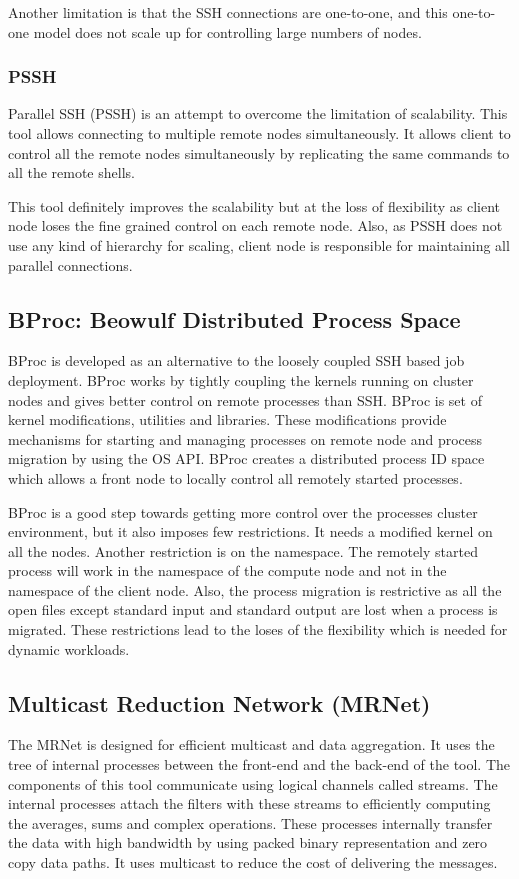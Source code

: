 Another limitation is that the SSH connections are one-to-one, and this
one-to-one model does not scale up for controlling large numbers of nodes.

\subsubsection{PSSH}
Parallel SSH (PSSH)\cite{pssh} is an attempt to overcome the limitation of
scalability.  This tool allows connecting to multiple remote nodes
simultaneously.  It allows client to control all the remote nodes simultaneously
by replicating the same commands to all the remote shells.

This tool definitely improves the scalability but at the loss of flexibility as
client node loses the fine grained control on each remote node.  Also, as PSSH
does not use any kind of hierarchy for scaling, client node is responsible for
maintaining all parallel connections.

\subsection{BProc: Beowulf Distributed Process Space}
BProc\cite{bproc} is developed as an alternative to the loosely coupled SSH
based job deployment. BProc works by tightly coupling the kernels running on
cluster nodes and gives better control on remote processes than SSH.  BProc
is set of kernel modifications, utilities and libraries.  These modifications
provide mechanisms for starting and managing processes on remote node and
process migration by using the OS API.  BProc creates a distributed process ID
space which allows a front node to locally control all remotely started
processes.

BProc is a good step towards getting more control over the processes cluster
environment, but it also imposes few restrictions.  It needs a modified kernel
on all the nodes.  Another restriction is on the namespace.  The remotely
started process will work in the namespace of the compute node and not in the
namespace of the client node.  Also, the process migration is restrictive as all
the open files except standard input and standard output are lost when a process
is migrated.  These restrictions lead to the loses of the flexibility which is
needed for dynamic workloads.

\subsection{Multicast Reduction Network (MRNet)}
The MRNet\cite{MRNet} is designed for efficient multicast and data aggregation.
 It uses the tree of internal processes between the front-end and the back-end
of the tool.  The components of this tool communicate using logical channels
called streams.  The internal processes attach the filters with these streams to
efficiently computing the averages, sums and complex operations.  These
processes internally transfer the data with high bandwidth by using packed
binary representation and zero copy data paths.  It uses multicast to reduce the
cost of delivering the messages.

